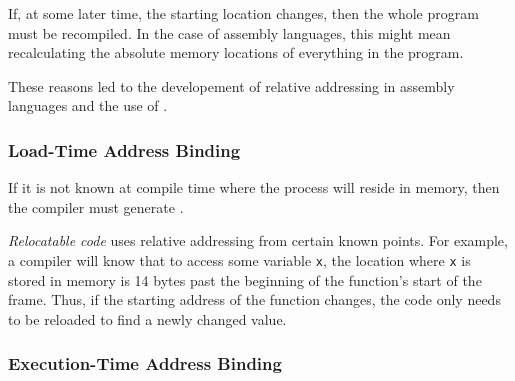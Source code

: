 If, at some later time, the starting location changes, then the whole program must be recompiled.
In the case of assembly languages, this might mean recalculating the absolute memory locations of everything in the program.

These reasons led to the developement of relative addressing in assembly languages and the use of .

\subsubsection{Load-Time Address Binding}\label{subsubsec:Load_Time_Address_Binding}
If it is not known at compile time where the process will reside in memory, then the compiler must generate .

\begin{definition}\label{def:Relocatable_Code}
  \emph{Relocatable code} uses relative addressing from certain known points.
  For example, a compiler will know that to access some variable \texttt{x}, the location where \texttt{x} is stored in memory is 14 bytes past the beginning of the function's start of the frame.
  Thus, if the starting address of the function changes, the code only needs to be reloaded to find a newly changed value.
\end{definition}

\subsubsection{Execution-Time Address Binding}\label{subsubsec:Execution_Time_Address_Binding}

